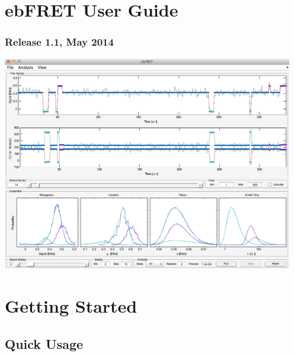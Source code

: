 \documentclass[12pt,article,oldfontcommands]{memoir}
\newcommand{\indt}{\qquad}
\begin{document}
\section*{ebFRET User Guide}
\subsubsection*{Release 1.1, May 2014}

\indt\includegraphics[width=5in]{images/ebfret_mainwindow}

\tableofcontents*



\section{Getting Started}
\label{Getting Started}

\subsection{Quick Usage}
\end{document}
